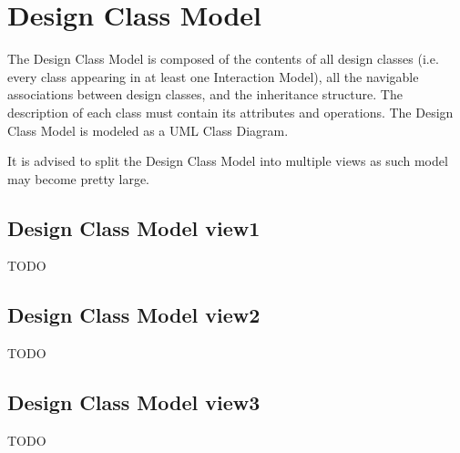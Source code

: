 \section{Design Class Model}
The Design Class Model is composed of the contents of all design classes (i.e.
every class appearing in at least one Interaction Model), all the navigable associations between design
classes, and the inheritance structure. The description of each class must
contain its attributes and operations. The Design Class Model is modeled as a
UML Class Diagram. 

It is advised to split the Design Class Model into multiple views as such model
may become pretty large. 
	

\subsection{Design Class Model view1}
TODO


\subsection{Design Class Model view2}
TODO



\subsection{Design Class Model view3}
TODO